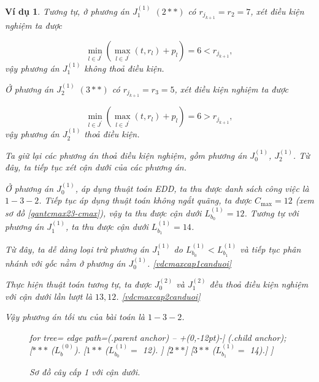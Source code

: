 \documentclass[12pt,a4paper]{report}
\newtheorem{vd}{Ví dụ}
\begin{document}
\begin{vd}
Tương tự, ở phương án $J_1^{(1)}$ $(2**)$ có $r_{j_{k+1}} = r_2 = 7$, xét điều kiện nghiệm ta được

\begin{equation*}
\underset{l \in J^{'}}{\min} (\underset{l \in J^{'}}{\max} (t, r_l) + p_l) = 6 < r_{j_{k+1}},
\end{equation*}
vậy phương án $J_1^{(1)}$ không thoả điều kiện.


Ở phương án $J_2^{(1)}$ $(3**)$ có $r_{j_{k+1}} = r_3 = 5$, xét điều kiện nghiệm ta được

\begin{equation*}
\underset{l \in J^{'}}{\min} (\underset{l \in J^{'}}{\max} (t, r_l) + p_l) = 6 > r_{j_{k+1}},
\end{equation*}
vậy phương án $J_2^{(1)}$ thoả điều kiện.

Ta giữ lại các phương án thoả điều kiện nghiệm, gồm phương án $J_0^{(1)}$, $J_2^{(1)}$. Từ đây, ta tiếp tục xét cận dưới của các phương án.

Ở phương án $J_0^{(1)}$, áp dụng thuật toán EDD, ta thu được danh sách công việc là $1-3-2$. Tiếp tục áp dụng thuật toán không ngắt quãng, ta được $C_{\max} = 12$ (xem sơ đồ \eqref{gantcmax23-cmax}), vậy ta thu được cận dưới $L_{b_0}^{(1)} = 12$. Tương tự với phương án $J_1^{(1)}$, ta thu được cận dưới $L_{b_1}^{(1)} = 14$.

Từ đây, ta dễ dàng loại trừ phương án $J_1^{(1)}$ do $L_{b_0}^{(1)} < L_{b_1}^{(1)}$ và tiếp tục phân nhánh với gốc nằm ở phương án $J_0^{(1)}$. \eqref{vdcmaxcap1canduoi}

Thực hiện thuật toán tương tự, ta được $J_0^{(2)}$ và $J_1^{(2)}$ đều thoả điều kiện nghiệm với cận dưới lần lượt là $13,12$. \eqref{vdcmaxcap2canduoi}

Vậy phương án tối ưu của bài toán là $1-3-2$.



















\begin{figure}[h!]
	\centering
	\begin{forest} for tree={
		edge path={\noexpand{} (.parent anchor) -- +(0,-12pt)-| (.child anchor);}
	}
	[{$***$ ($L_b^{(0)}$).}
		[{$1**$ ($L_{b_0}^{(1)} =$ 12).}
		]
		[$2**$]
		[{$3**$ ($L_{b_1}^{(1)} =$ 14).}]
	]
	\end{forest}
\caption{\label{vdcmaxcap1canduoi} Sơ đồ cây cấp 1 với cận dưới.}
\end{figure}


\end{vd}
\end{document}
